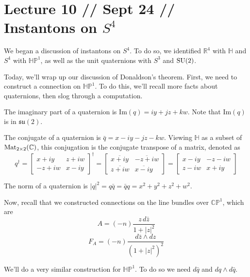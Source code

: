 \documentclass[main]{subfiles}
\begin{document}
\section*{Lecture 10 // Sept 24 // Instantons on $S^4$}

\begin{recall}
We began a discussion of instantons on $S^4$. To do so, we identified $\mathbb{R}^4$ with $\mathbb{H}$ and $S^4$ with $\mathbb{HP}^1$, as well as the unit quaternions with $S^3$ and $\operatorname{SU}(2)$.
\end{recall}

Today, we'll wrap up our discussion of Donaldson's theorem. First, we need to construct a connection on $\mathbb{HP}^1$. To do this, we'll recall more facts about quaternions, then slog through a computation.

\begin{definition}
The imaginary part of a quaternion is $\mathrm{Im}(q)=iy+jz+kw$. Note that $\mathrm{Im}(q)$ is in $\mathfrak{su}(2)$.
\end{definition}

\begin{definition}
The conjugate of a quaternion is $\bar q = x-iy-jz-kw$. Viewing $\mathbb{H}$ as a subset of $\operatorname{Mat}_{2\times 2}(\mathbb{C})$, this conjugation is the conjugate transpose of a matrix, denoted as
\[
q^\dagger = \begin{bmatrix}x+iy & z+iw\\ -z+iw & x-iy\end{bmatrix}^\dagger = \begin{bmatrix}\overline{x+iy} & \overline{-z+iw}\\ \overline{z+iw} & \overline{x-iy}\end{bmatrix} = \begin{bmatrix}x-iy & -z-iw\\ z-iw & x+iy\end{bmatrix}
\]
\end{definition}

\begin{definition}
The norm of a quaternion is $|q|^2 = q\bar q = \bar q q = x^2+y^2+z^2+w^2$.
\end{definition}

Now, recall that we constructed connections on the line bundles over $\mathbb{CP}^1$, which are
\[
A = (-n)\frac{z\,d\bar z}{1+|z|^2}
\]
\[
F_A = (-n)\frac{d\bar z\wedge dz}{(1+|z|^2)^2}
\]

We'll do a very similar construction for $\mathbb{HP}^1$. To do so we need $d\bar q$ and $dq\wedge d\bar q$.
\end{document}
